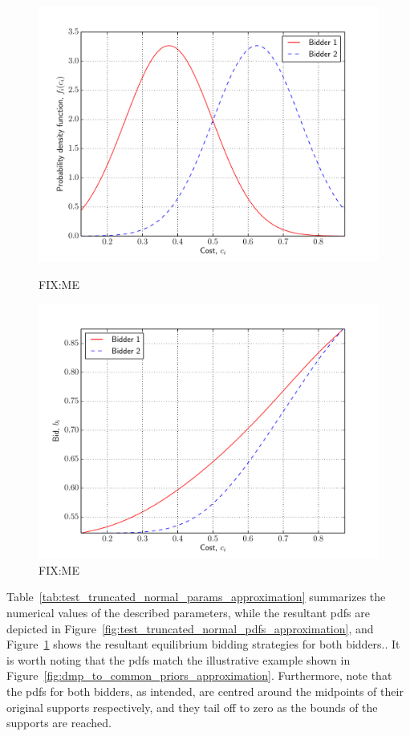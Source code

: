 \begin{figure}[p!]
  \includegraphics[width=\figsize]{Approximation/Figures/test_truncated_normal_pdfs}
  \caption{FIX:ME}
  \label{fig:test_truncated_normal_pdfs_approximation}
  \vspace{10mm}
  \includegraphics[width=\figsize]{Approximation/Figures/test_truncated_normal_bids}
  \caption{FIX:ME}
  \label{fig:test_truncated_normal_bids_approximation}
\end{figure}

Table~\ref{tab:test_truncated_normal_params_approximation} summarizes the numerical values of the described parameters, while the resultant pdfs are depicted in Figure~\ref{fig:test_truncated_normal_pdfs_approximation}, and Figure~\ref{fig:test_truncated_normal_bids_approximation} shows the resultant equilibrium bidding strategies for both bidders.. It is worth noting that the pdfs match the illustrative example shown in Figure~\ref{fig:dmp_to_common_priors_approximation}. Furthermore, note that the pdfs for both bidders, as intended, are centred around the midpoints of their original supports respectively, and they tail off to zero as the bounds of the supports are reached.

